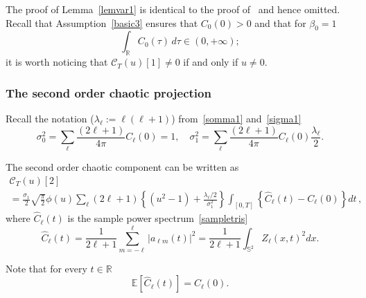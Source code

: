 \documentclass[10pt]{amsart}
\theoremstyle{definition}\newtheorem{defi}[theo]{Definition}\newtheorem{rema}[theo]{Remark}\newtheorem{exam}[theo]{Example}\newtheorem{exem}[theo]{Example}\newtheorem{nota}[theo]{Notation}
\newcommand{\clC}{\mathcal{C}}
\newcommand{\bbS}{\mathbb{S}}
\newcommand{\bbR}{\mathbb{R}}
\newcommand{\bbE}{\mathbb{E}}
\begin{document}
The proof of Lemma~\ref{lemvar1} is identical to the proof of~\cite[Lem\-ma~4.2]{MRV:20} and hence omitted. Recall that Assumption~\ref{basic3} ensures that $C_0(0)>0$ and that for $\beta_0=1$
\begin{equation*}
\int_{\bbR} C_0(\tau)\,d\tau \in (0,+\infty);
\end{equation*}
it is worth noticing that $\clC_T(u)[1]\ne 0$ if and only if $u\ne 0$.

\subsubsection{The second order chaotic projection}

Recall the notation ($\lambda _{\ell }:=\ell(\ell +1)$) from~\eqref{somma1} and~\eqref{sigma1}
\begin{equation*}
\sigma_{0}^{2} =\sum_{\ell}\frac{(2\ell +1)}{4\pi}C_{\ell}(0)=1,\quad
\sigma_{1}^{2} =\sum_{\ell}\frac{(2\ell +1)}{4\pi}C_{\ell}(0)\frac{\lambda _{\ell}}{2}.
\end{equation*}

\begin{prop}\label{propcaos2}
The second order chaotic component can be written as
\begin{multline}\label{2chaos}
\clC_T(u)[2]\\
=\frac{\sigma _{1}}{2}\sqrt{\frac{\pi }{2}}\phi (u)\sum_{\ell }(2\ell +1)\left\{ \left(u^{2}-1\right)+\frac{\lambda_{\ell }/2}{\sigma _{1}^{2}}
\right\} \int_{[0,T]} \left\{\widehat{C}_{\ell }(t)-C_{\ell }(0)\right\} dt \,,
\end{multline}
where $\widehat{C}_{\ell }(t)$ is the sample power spectrum~\eqref{sampletris}
\begin{equation*}
\widehat{C}_{\ell }(t)=\frac{1}{2\ell +1}\sum_{m=-\ell}^{\ell }\left\vert a_{\ell m}(t)\right\vert^{2}=\frac{1}{2\ell +1}\int_{\bbS^{2}}Z_{\ell}(x,t)^{2}dx\text{.}
\end{equation*}
\end{prop}

Note that for every $t\in \bbR$
\begin{equation*}
\bbE\left[\widehat C_\ell(t)\right] = C_\ell(0).
\end{equation*}
\end{document}
